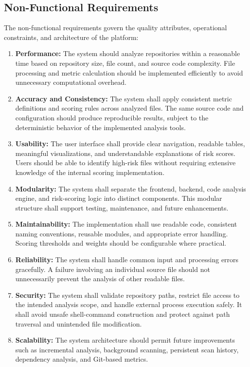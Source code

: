 \subsection{Non-Functional Requirements}
The non-functional requirements govern the quality attributes, operational constraints, and architecture of the platform:
\begin{enumerate}
    \item \textbf{Performance:} The system should analyze repositories within a reasonable time based on repository size, file count, and source code complexity. File processing and metric calculation should be implemented efficiently to avoid unnecessary computational overhead.
    \item \textbf{Accuracy and Consistency:} The system shall apply consistent metric definitions and scoring rules across analyzed files. The same source code and configuration should produce reproducible results, subject to the deterministic behavior of the implemented analysis tools.
    \item \textbf{Usability:} The user interface shall provide clear navigation, readable tables, meaningful visualizations, and understandable explanations of risk scores. Users should be able to identify high-risk files without requiring extensive knowledge of the internal scoring implementation.
    \item \textbf{Modularity:} The system shall separate the frontend, backend, code analysis engine, and risk-scoring logic into distinct components. This modular structure shall support testing, maintenance, and future enhancements.
    \item \textbf{Maintainability:} The implementation shall use readable code, consistent naming conventions, reusable modules, and appropriate error handling. Scoring thresholds and weights should be configurable where practical.
    \item \textbf{Reliability:} The system shall handle common input and processing errors gracefully. A failure involving an individual source file should not unnecessarily prevent the analysis of other readable files.
    \item \textbf{Security:} The system shall validate repository paths, restrict file access to the intended analysis scope, and handle external process execution safely. It shall avoid unsafe shell-command construction and protect against path traversal and unintended file modification.
    \item \textbf{Scalability:} The system architecture should permit future improvements such as incremental analysis, background scanning, persistent scan history, dependency analysis, and Git-based metrics.
\end{enumerate}

